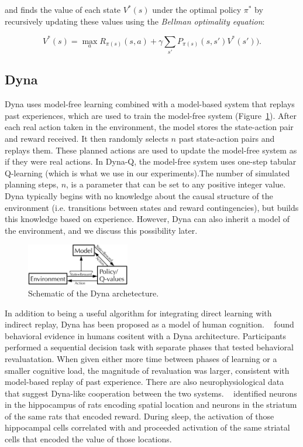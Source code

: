 \documentclass[letterpaper]{article}
\begin{document}
\noindent
and finds the value of each state $V^{*}(s)$ under the optimal policy $\pi^*$ by recursively updating these values using the \textit{Bellman optimality equation}:

\begin{equation}
V^{*}(s) = \max_a R_{\pi(s)}(s,a) + \gamma \sum\limits_{s'} P_{\pi(s)}(s,s')V^{*}(s')).
\end{equation}

\subsection{Dyna}

Dyna uses model-free learning combined with a model-based system that replays past experiences, which are used to train the model-free system (Figure~\ref{fig:dyna_schematic}). After each real action taken in the environment, the model stores the state-action pair and reward received. It then randomly selects $n$ past state-action pairs and replays them. These planned actions are used to update the model-free system as if they were real actions. In Dyna-Q, the model-free system uses one-step tabular Q-learning (which is what we use in our experiments).The number of simulated planning steps, $n$, is a parameter that can be set to any positive integer value. Dyna typically begins with no knowledge about the causal structure of the environment (i.e. transitions between states and reward contingencies), but builds this knowledge based on experience. However, Dyna can also inherit a model of the environment, and we discuss this possibility later.

\begin{figure}[ht]
\centering
\includegraphics[width=0.4\textwidth]{dyna_schematic}
\caption{Schematic of the Dyna archetecture.}
\label{fig:dyna_schematic}
\end{figure}

In addition to being a useful algorithm for integrating direct learning with indirect replay, Dyna has been proposed as a model of human cognition. ~\cite{gershman2014retrospective} found behavioral evidence in humans cositent with a Dyna architecture.  Participants performed a sequential decision task with separate phases that tested behavioral revaluatation. When given either more time between phases of learning or a smaller cognitive load, the magnitude of revaluation was larger, consistent with model-based replay of past experience. There are also neurophysiological data that suggest Dyna-like cooperation between the two systems. ~\cite{lansink2009hippocampus} identified neurons in the hippocampus of rats encoding spatial location and neurons in the striatum of the same rats that encoded reward. During sleep, the activation of those hippocampal cells correlated with and proceeded activation of the same striatal cells that encoded the value of those locations.
\end{document}
